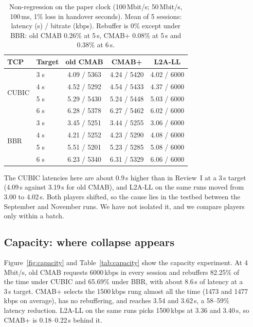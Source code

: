 \documentclass[sigconf]{acmart}
\newcommand{\cmabp}{CMAB+\xspace}
\newcommand{\oldcmab}{old CMAB\xspace}
\newcommand{\kbps}{\,kbps\xspace}
\begin{document}
\begin{table}[t]
\caption{Non-regression on the paper clock (100\,Mbit/s; 50\,Mbit/s, 100\,ms, 1\% loss in handover seconds). Mean of 5 sessions: latency (s) / bitrate (kbps). Rebuffer is 0\% except under BBR: old CMAB 0.26\% at 5\,s, CMAB+ 0.08\% at 5\,s and 0.38\% at 6\,s.}
\label{tab:nonreg}
\footnotesize
\begin{tabular}{@{}llccc@{}}
\toprule
TCP & Target & old CMAB & CMAB+ & L2A-LL \\
\midrule
\multirow{4}{*}{CUBIC} & 3 s & 4.09 / 5363 & 4.24 / 5420 & 4.02 / 6000 \\
 & 4 s & 4.52 / 5292 & 4.54 / 5433 & 4.37 / 6000 \\
 & 5 s & 5.29 / 5430 & 5.24 / 5448 & 5.03 / 6000 \\
 & 6 s & 6.28 / 5378 & 6.27 / 5462 & 6.02 / 6000 \\
\midrule
\multirow{4}{*}{BBR} & 3 s & 3.45 / 5251 & 3.44 / 5255 & 3.06 / 6000 \\
 & 4 s & 4.21 / 5252 & 4.23 / 5290 & 4.08 / 6000 \\
 & 5 s & 5.51 / 5201 & 5.23 / 5285 & 5.08 / 6000 \\
 & 6 s & 6.23 / 5340 & 6.31 / 5329 & 6.06 / 6000 \\
\bottomrule
\end{tabular}
\end{table}

The CUBIC latencies here are about 0.9\,s higher than in Review~I at a 3\,s target (4.09\,s against 3.19\,s for \oldcmab), and L2A-LL on the same runs moved from 3.00 to 4.02\,s. Both players shifted, so the cause lies in the testbed between the September and November runs. We have not isolated it, and we compare players only within a batch.

\subsection{Capacity: where collapse appears}
\label{sec:capacity}

Figure~\ref{fig:capacity} and Table~\ref{tab:capacity} show the capacity experiment. At 4\,Mbit/s, \oldcmab requests 6000\kbps in every session and rebuffers 82.25\% of the time under CUBIC and 65.69\% under BBR, with about 8.6\,s of latency at a 3\,s target. \cmabp selects the 1500\kbps rung almost all the time (1473 and 1477\kbps on average), has no rebuffering, and reaches 3.54 and 3.62\,s, a 58--59\% latency reduction. L2A-LL on the same runs picks 1500\kbps at 3.36 and 3.40\,s, so \cmabp is 0.18--0.22\,s behind it.
\end{document}
